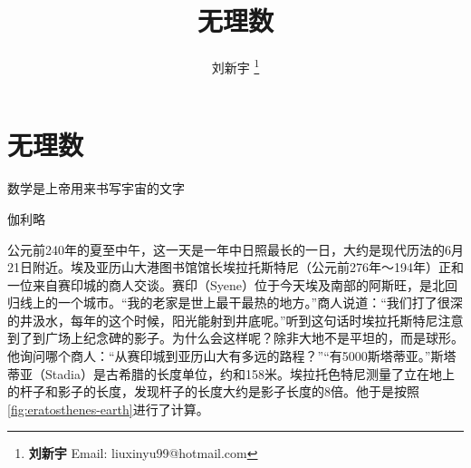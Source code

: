\documentclass[b5paper]{ctexart}
\begin{document}
\title{无理数}

\author{刘新宇
\thanks{{\bfseries 刘新宇} \newline
  Email: liuxinyu99@hotmail.com \newline}
  }

\maketitle
\fi


\ifx\wholebook\relax
\chapter{无理数}
\fi

\epigraph{数学是上帝用来书写宇宙的文字}{伽利略}

公元前240年的夏至中午，这一天是一年中日照最长的一日，大约是现代历法的6月21日附近。埃及亚历山大港图书馆馆长埃拉托斯特尼（公元前276年～194年）正和一位来自赛印城的商人交谈。赛印（Syene）位于今天埃及南部的阿斯旺，是北回归线上的一个城市。“我的老家是世上最干最热的地方。”商人说道：“我们打了很深的井汲水，每年的这个时候，阳光能射到井底呢。”听到这句话时埃拉托斯特尼注意到了到广场上纪念碑的影子。为什么会这样呢？除非大地不是平坦的，而是球形。他询问哪个商人：“从赛印城到亚历山大有多远的路程？”“有5000斯塔蒂亚。”斯塔蒂亚（Stadia）是古希腊的长度单位，约和158米。埃拉托色特尼测量了立在地上的杆子和影子的长度，发现杆子的长度大约是影子长度的8倍。他于是按照\cref{fig:eratosthenes-earth}进行了计算。
\end{document}
